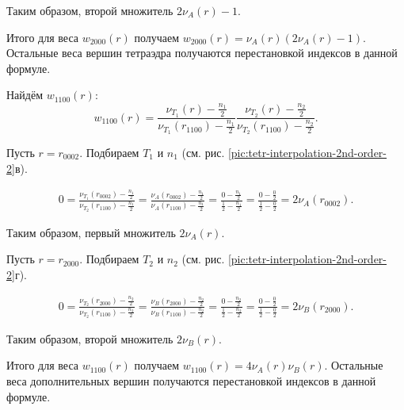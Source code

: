 Таким образом, второй множитель $2\nu_{A}(r)-1$.

Итого для веса $w_{2000}(r)$ получаем $w_{2000}(r) = \nu_{A}(r) (2\nu_{A}(r)-1)$. Остальные веса вершин тетраэдра получаются перестановкой индексов в данной формуле.

Найдём $w_{1100}(r)$:
\begin{equation}
w_{1100}(r) = \frac{ \nu_{T_1}(r) - \frac{n_1}{2} }{ \nu_{T_1}(r_{1100}) - \frac{n_1}{2} } \frac{ \nu_{T_2}(r) - \frac{n_2}{2} }{ \nu_{T_2}(r_{1100}) - \frac{n_2}{2} }.
\end{equation}

Пусть $r = r_{0002}$. Подбираем $T_1$ и $n_1$ (см. рис. \ref{pic:tetr-interpolation-2nd-order-2}в).

\begin{align}
0 = \frac{ \nu_{T_1}(r_{0002}) - \frac{n_1}{2} }{ \nu_{T_2}(r_{1100}) - \frac{n_1}{2} } = \frac{ \nu_{A}(r_{0002}) - \frac{n_1}{2} }{ \nu_{A}(r_{1100}) - \frac{n_1}{2} } = \frac{ 0 - \frac{n_1}{2} }{ \frac{1}{2} - \frac{n_1}{2} } = \frac{ 0 - \frac{0}{2} }{ \frac{1}{2} - \frac{0}{2} } = 2\nu_{A}(r_{0002}).
\end{align}

Таким образом, первый множитель $2\nu_{A}(r)$.

Пусть $r = r_{2000}$. Подбираем $T_2$ и $n_2$ (см. рис. \ref{pic:tetr-interpolation-2nd-order-2}г).

\begin{align}
0 = \frac{ \nu_{T_2}(r_{2000}) - \frac{n_2}{2} }{ \nu_{T_2}(r_{1100}) - \frac{n_2}{2} } = \frac{ \nu_{B}(r_{2000}) - \frac{n_2}{2} }{ \nu_{B}(r_{1100}) - \frac{n_2}{2} } = \frac{ 0 - \frac{n_2}{2} }{ \frac{1}{2} - \frac{n_2}{2} } = \frac{ 0 - \frac{0}{2} }{ \frac{1}{2} - \frac{0}{2} } = 2\nu_{B}(r_{2000}).
\end{align}

Таким образом, второй множитель $2\nu_{B}(r)$.

Итого для веса $w_{1100}(r)$ получаем $w_{1100}(r) = 4 \nu_{A}(r) \nu_{B}(r)$. Остальные веса дополнительных вершин получаются перестановкой индексов в данной формуле.




